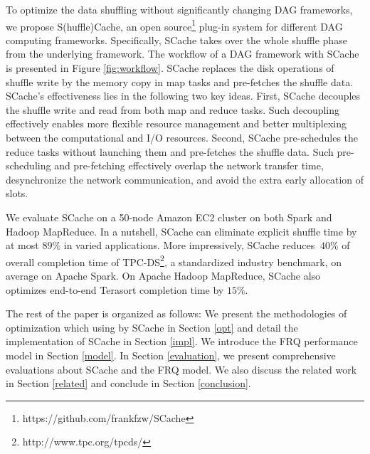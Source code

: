 {\color{black}
To optimize the data shuffling without significantly changing DAG frameworks, we propose S(huffle)Cache, an open source\footnote{https://github.com/frankfzw/SCache} plug-in system for different DAG computing frameworks.
Specifically, SCache takes over the whole shuffle phase from the underlying framework.
The workflow of a DAG framework with SCache is presented in Figure \ref{fig:workflow}. 
SCache replaces the disk operations of shuffle write by the memory copy in map tasks and pre-fetches the shuffle data.
SCache's effectiveness lies in the following two key ideas.
First, SCache decouples the shuffle write and read from both map and reduce tasks.
Such decoupling effectively enables more flexible resource management and better multiplexing between the computational and I/O resources.
Second, SCache pre-schedules the reduce tasks without launching them and pre-fetches the shuffle data. 
Such pre-scheduling and pre-fetching effectively overlap the network transfer time, desynchronize the network communication, 
and avoid the extra early allocation of slots.

We evaluate SCache on a 50-node Amazon EC2 cluster on both Spark and Hadoop MapReduce.
In a nutshell, SCache can eliminate explicit shuffle time by at most $89\%$ in varied applications. More impressively, SCache reduces $~40\%$ of overall completion time of TPC-DS\footnote{http://www.tpc.org/tpcds/}, a standardized industry benchmark, on average on Apache Spark. On Apache Hadoop MapReduce, SCache also optimizes end-to-end Terasort completion time by $15\%$.


The rest of the paper is organized as follows:
{\color{black}
We present the methodologies of optimization which using by SCache in Section \ref{opt} and detail the implementation of SCache in Section \ref{impl}.
We introduce the FRQ performance model in Section \ref{model}.
In Section \ref{evaluation}, we present comprehensive evaluations about SCache and the FRQ model.
We also discuss the related work in Section \ref{related} and conclude in Section \ref{conclusion}.
}
}

